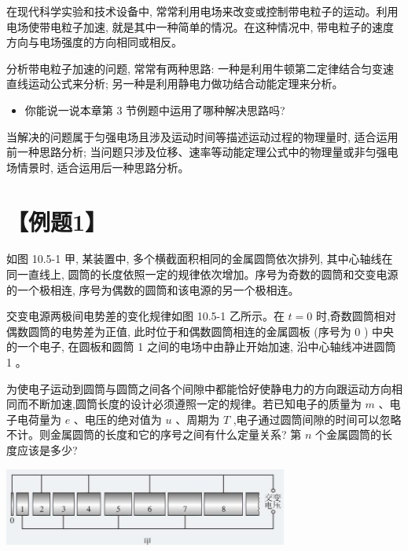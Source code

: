 \documentclass[10pt]{article}
\begin{document}
在现代科学实验和技术设备中, 常常利用电场来改变或控制带电粒子的运动。利用电场使带电粒子加速, 就是其中一种简单的情况。在这种情况中, 带电粒子的速度方向与电场强度的方向相同或相反。

分析带电粒子加速的问题, 常常有两种思路: 一种是利用牛顿第二定律结合匀变速直线运动公式来分析; 另一种是利用静电力做功结合动能定理来分析。

\begin{mdframed}

\begin{itemize}
\item 你能说一说本章第 3 节例题中运用了哪种解决思路吗?
\end{itemize}

\end{mdframed}

当解决的问题属于匀强电场且涉及运动时间等描述运动过程的物理量时, 适合运用前一种思路分析; 当问题只涉及位移、速率等动能定理公式中的物理量或非匀强电场情景时, 适合运用后一种思路分析。

\section*{【例题1】}

如图 10.5-1 甲, 某装置中, 多个横截面积相同的金属圆筒依次排列, 其中心轴线在同一直线上, 圆筒的长度依照一定的规律依次增加。序号为奇数的圆筒和交变电源的一个极相连, 序号为偶数的圆筒和该电源的另一个极相连。

交变电源两极间电势差的变化规律如图 10.5-1 乙所示。在 \(t = 0\) 时,奇数圆筒相对偶数圆筒的电势差为正值, 此时位于和偶数圆筒相连的金属圆板 (序号为 0 ) 中央的一个电子, 在圆板和圆筒 1 之间的电场中由静止开始加速, 沿中心轴线冲进圆筒 1 。

为使电子运动到圆筒与圆筒之间各个间隙中都能恰好使静电力的方向跟运动方向相同而不断加速,圆筒长度的设计必须遵照一定的规律。若已知电子的质量为 \(m\) 、电子电荷量为 \(e\) 、电压的绝对值为 \(u\) 、周期为 \(T\) ,电子通过圆筒间隙的时间可以忽略不计。则金属圆筒的长度和它的序号之间有什么定量关系? 第 \(n\) 个金属圆筒的长度应该是多少?

\begin{center}
\includegraphics[max width=0.7\textwidth]{images/01911d5f-8e38-70c0-b5b8-2b399bd115b6_50_549033.jpg}
\end{center}
\end{document}
